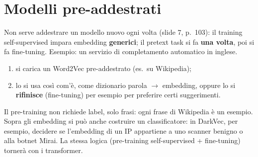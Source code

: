 \section{Modelli pre-addestrati}
Non serve addestrare un modello nuovo ogni volta (slide 7, p.~103): il training self-supervised impara embedding \textbf{generici};
il pretext task si fa \textbf{una volta}, poi si fa fine-tuning. Esempio: un servizio di completamento automatico in inglese.
\begin{enumerate}
  \item si carica un Word2Vec pre-addestrato (es.\ su Wikipedia);
  \item lo si usa così com'è, come dizionario parola $\to$ embedding, oppure lo si \textbf{rifinisce} (fine-tuning) per esempio per
        preferire certi suggerimenti.
\end{enumerate}
Il pre-training non richiede label, solo frasi: ogni frase di Wikipedia è un esempio. Sopra gli embedding si può anche costruire un
classificatore: in DarkVec, per esempio, decidere se l'embedding di un IP appartiene a uno scanner benigno o alla botnet Mirai. La
stessa logica (pre-training self-supervised + fine-tuning) tornerà con i transformer.

